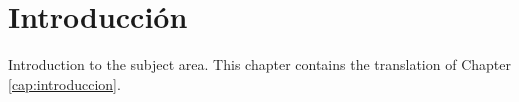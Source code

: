 \chapter*{Introducción}
\label{cap:introduccion}

Introduction to the subject area. This chapter contains the translation of Chapter \ref{cap:introduccion}.









